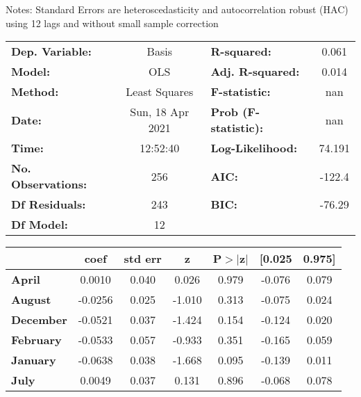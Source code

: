 Notes: \newline
 [1] Standard Errors are heteroscedasticity and autocorrelation robust (HAC) using 12 lags and without small sample correction
\begin{center}
\begin{tabular}{lclc}
\toprule
\textbf{Dep. Variable:}    &      Basis       & \textbf{  R-squared:         } &     0.061   \\
\textbf{Model:}            &       OLS        & \textbf{  Adj. R-squared:    } &     0.014   \\
\textbf{Method:}           &  Least Squares   & \textbf{  F-statistic:       } &       nan   \\
\textbf{Date:}             & Sun, 18 Apr 2021 & \textbf{  Prob (F-statistic):} &      nan    \\
\textbf{Time:}             &     12:52:40     & \textbf{  Log-Likelihood:    } &    74.191   \\
\textbf{No. Observations:} &         256      & \textbf{  AIC:               } &    -122.4   \\
\textbf{Df Residuals:}     &         243      & \textbf{  BIC:               } &    -76.29   \\
\textbf{Df Model:}         &          12      & \textbf{                     } &             \\
\bottomrule
\end{tabular}
\begin{tabular}{lcccccc}
                   & \textbf{coef} & \textbf{std err} & \textbf{z} & \textbf{P$> |$z$|$} & \textbf{[0.025} & \textbf{0.975]}  \\
\midrule
\textbf{April}     &       0.0010  &        0.040     &     0.026  &         0.979        &       -0.076    &        0.079     \\
\textbf{August}    &      -0.0256  &        0.025     &    -1.010  &         0.313        &       -0.075    &        0.024     \\
\textbf{December}  &      -0.0521  &        0.037     &    -1.424  &         0.154        &       -0.124    &        0.020     \\
\textbf{February}  &      -0.0533  &        0.057     &    -0.933  &         0.351        &       -0.165    &        0.059     \\
\textbf{January}   &      -0.0638  &        0.038     &    -1.668  &         0.095        &       -0.139    &        0.011     \\
\textbf{July}      &       0.0049  &        0.037     &     0.131  &         0.896        &       -0.068    &        0.078     \\

\end{tabular}
\end{center}
